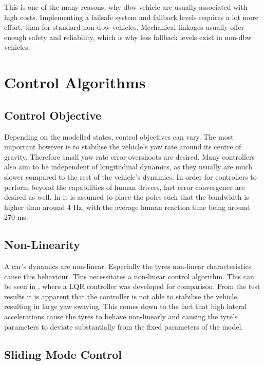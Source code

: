 \documentclass[conference]{IEEEtran}
\begin{document}
This is one of the many reasons, why dbw vehicle are usually associated with high costs. Implementing a failsafe system and fallback levels requires a lot more effort, than for standard non-dbw vehicles. Mechanical linkages usually offer enough safety and reliability, which is why less fallback levels exist in non-dbw vehicles. 



\section{Control Algorithms}

\subsection{Control Objective}

Depending on the modelled states, control objectives can vary. The most important however is to stabilise the vehicle's yaw rate around its centre of gravity. Therefore small yaw rate error overshoots are desired. Many controllers also aim to be independent of longitudinal dynamics, as they usually are much slower compared to the rest of the vehicle's dynamics. In order for controllers to perform beyond the capabilities of human drivers, fast error convergence are desired as well. In \cite{vandersande} it is assumed to place the poles such that the bandwidth is higher than around 4 Hz, with the average human reaction time being around 270 ms. 

\subsection{Non-Linearity}

A car's dynamics are non-linear. Especially the tyres non-linear characteristics cause this behaviour. This necessitates a non-linear control algorithm. This can be seen in \cite{vandersande}, where a LQR controller was developed for comparison. From the test results it is apparent that the controller is not able to stabilise the vehicle, resulting in large yaw swaying. This comes down to the fact that high lateral accelerations cause the tyres to behave non-linearly and causing the tyre's parameters to deviate substantially from the fixed parameters of the model.


\subsection{Sliding Mode Control}
\end{document}
